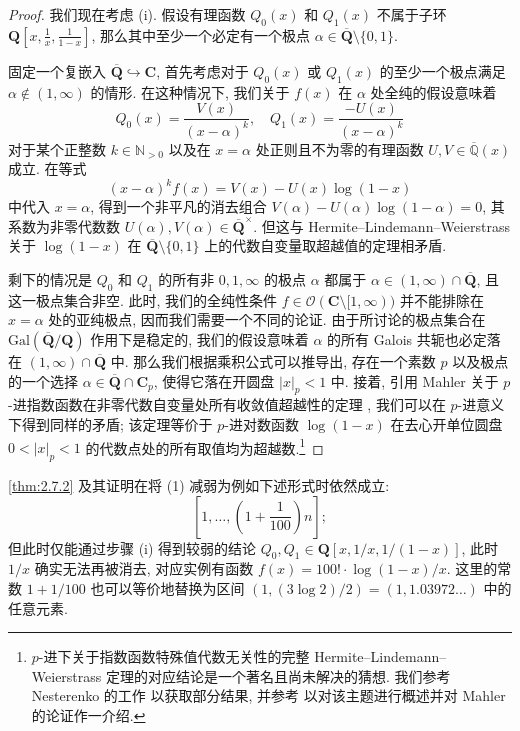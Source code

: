 \begin{proof}
我们现在考虑 (i). 假设有理函数 \(Q_0(x)\) 和 \(Q_1(x)\) 不属于子环 \(\mathbf{Q}\left[x, \frac{1}{x}, \frac{1}{1-x}\right]\), 那么其中至少一个必定有一个极点 \(\alpha \in \overline{\mathbf{Q}} \setminus \{0, 1\}\).

固定一个复嵌入 \(\overline{\mathbf{Q}} \hookrightarrow \mathbf{C}\), 首先考虑对于 \(Q_0(x)\) 或 \(Q_1(x)\) 的至少一个极点满足 \(\alpha \notin (1, \infty)\) 的情形. 
在这种情况下, 我们关于 \(f(x)\) 在 \(\alpha\) 处全纯的假设意味着
\[ Q_0(x) = \frac{V(x)}{(x-\alpha)^k}, \quad Q_1(x) = \frac{-U(x)}{(x-\alpha)^k} \]
对于某个正整数 \(k \in \mathbb{N}_{>0}\) 以及在 \(x = \alpha\) 处正则且不为零的有理函数 \(U, V \in \overline{\mathbb{Q}}(x)\) 成立. 
在等式
\[ (x - \alpha)^k f(x) = V(x) - U(x)\log(1 - x) \]
中代入 \(x = \alpha\), 得到一个非平凡的消去组合 \(V(\alpha) - U(\alpha) \log(1 - \alpha) = 0\), 其系数为非零代数数 \(U(\alpha), V(\alpha) \in \overline{\mathbf{Q}}^{\times}\). 
但这与 Hermite--Lindemann--Weierstrass 关于 \(\log(1-x)\) 在 \(\overline{\mathbf{Q}} \setminus \{0,1\}\) 上的代数自变量取超越值的定理相矛盾.

剩下的情况是 \(Q_0\) 和 \(Q_1\) 的所有非 \(0, 1, \infty\) 的极点 \(\alpha\) 都属于 \(\alpha \in (1, \infty) \cap \overline{\mathbf{Q}}\), 且这一极点集合非空. 
此时, 我们的全纯性条件 \(f \in \mathcal{O}(\mathbf{C} \setminus [1, \infty))\) 并不能排除在 \(x = \alpha\) 处的亚纯极点, 因而我们需要一个不同的论证. 
由于所讨论的极点集合在 \(\mathrm{Gal}(\overline{\mathbf{Q}}/\mathbf{Q})\) 作用下是稳定的, 我们的假设意味着 \(\alpha\) 的所有 Galois 共轭也必定落在 \((1, \infty) \cap \overline{\mathbf{Q}}\) 中. 
那么我们根据乘积公式可以推导出, 存在一个素数 \(p\) 以及极点的一个选择 \(\alpha \in \overline{\mathbf{Q}} \cap \mathbf{C}_p\), 使得它落在开圆盘 \(|x|_p < 1\) 中. 
接着, 引用 Mahler 关于 \(p\)-进指数函数在非零代数自变量处所有收敛值超越性的定理 \cite{Mah19a}, 我们可以在 \(p\)-进意义下得到同样的矛盾; 
该定理等价于 \(p\)-进对数函数 \(\log(1-x)\) 在去心开单位圆盘 \(0 < |x|_p < 1\) 的代数点处的所有取值均为超越数.\footnote{\(p\)-进下关于指数函数特殊值代数无关性的完整 Hermite--Lindemann--Weierstrass 定理的对应结论是一个著名且尚未解决的猜想. 我们参考 Nesterenko 的工作 \cite{Nes08} 以获取部分结果, 并参考 \cite[§ 2.4]{Nes19} 以对该主题进行概述并对 Mahler 的论证作一介绍.}
\end{proof}

\begin{remark}[Remark 2.7.4]\label{rem:2.7.4}
\autoref{thm:2.7.2} 及其证明在将 (1) 减弱为例如下述形式时依然成立:
\[ \left[1,\ldots,\left(1+\frac{1}{100}\right)n\right]; \]
但此时仅能通过步骤 (i) 得到较弱的结论 \(Q_0, Q_1 \in \mathbf{Q}[x, 1/x, 1/(1-x)]\), 此时 \(1/x\) 确实无法再被消去, 对应实例有函数 \(f(x) = 100! \cdot \log(1-x)/x\). 
这里的常数 \(1 + 1/100\) 也可以等价地替换为区间 \((1, (3 \log 2)/2) = (1, 1.03972\dots)\) 中的任意元素.
\end{remark}

